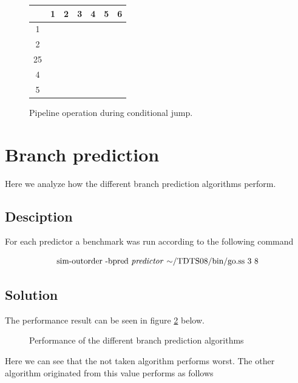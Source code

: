 \documentclass[titlepage, a4paper]{article}
\begin{document}
\begin{figure}[H]
  \centering
  \begin{tabular}{|c|c|c|c|c|c|c|}
    \hline
        {} & {1} & {2} & {3} & {4} & {5} & {6} \\ \hline
        {1} & \cellcolor{blue!25}{IF} & \cellcolor{orange!25}{EX} & {} & {} & {} & {} \\ \hline
        {2} & {} & \cellcolor{blue!25}{IF} & \cellcolor{orange!25}{EX} & {} & {} & {} \\ \hline
        {25} & {} & {} & \cellcolor{blue!25}{IF} & {} & {} & {} \\ \hline
        {4} & {} & {} & {} & \cellcolor{blue!25}{IF} & \cellcolor{orange!25}{EX} & {} \\ \hline
        {5} & {} & {} & {} & {} & \cellcolor{blue!25}{IF} & \cellcolor{orange!25}{EX} \\ \hline
  \end{tabular}
  \caption{Pipeline operation during conditional jump.}
  \label{fig:condjmp_pipe_op}
\end{figure}

\section{Branch prediction}
Here we analyze how the different branch prediction algorithms perform.

\subsection{Desciption}
For each predictor a benchmark was run according to the following command

$$\text{sim-outorder -bpred \textit{predictor} $\mathtt{\sim}$/TDTS08/bin/go.ss 3 8}$$


\subsection{Solution}
The performance result can be seen in figure \ref{fig:performance} below.

\begin{figure}[H]
	\centering
	\caption{Performance of the different branch prediction algorithms}
	\label{fig:performance}
\end{figure}
Here we can see that the not taken algorithm performs worst. The other algorithm originated from this value performs as follows
\end{document}
